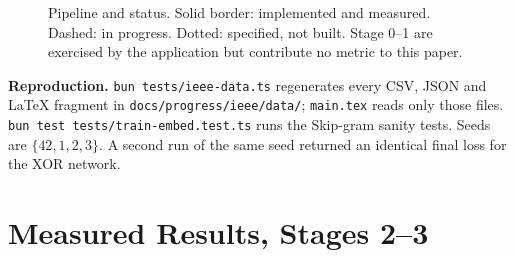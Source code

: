 \documentclass[conference]{IEEEtran}
\begin{document}
\begin{figure}[t]
\centering
{}
\caption{Pipeline and status. Solid border: implemented and measured. Dashed: in progress. Dotted: specified, not built. Stage 0--1 are exercised by the application but contribute no metric to this paper.}
\label{fig:pipeline}
\end{figure}

\textbf{Reproduction.} \texttt{bun tests/ieee-data.ts} regenerates every CSV, JSON and LaTeX fragment in \texttt{docs/progress/ieee/data/}; \texttt{main.tex} reads only those files. \texttt{bun test tests/train-embed.test.ts} runs the Skip-gram sanity tests. Seeds are $\{42,1,2,3\}$. A second run of the same seed returned an identical final loss for the XOR network.

\section{Measured Results, Stages 2--3}\label{sec:measured}
\end{document}
